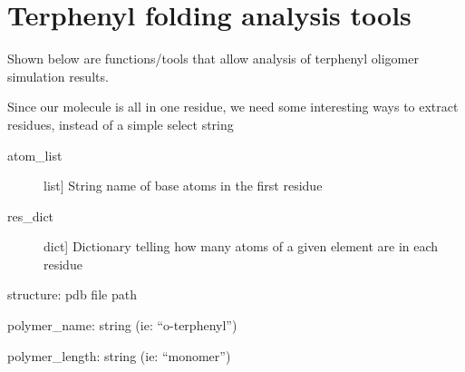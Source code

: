 \documentclass[letterpaper,12pt,english,openany,oneside]{sphinxmanual}
\begin{document}
\chapter{Terphenyl folding analysis tools}
\label{\detokenize{analysis:terphenyl-folding-analysis-tools}}\label{\detokenize{analysis::doc}}
Shown below are functions/tools that allow analysis of terphenyl oligomer simulation results.

\label{\detokenize{analysis:module-analysis}}

\begin{fulllineitems}
\label{\detokenize{analysis:analysis.construct_selector}}
Since our molecule is all in one residue, we need some interesting ways to extract residues, instead of a simple
select string
\begin{description}
\item[{atom\_list}] \leavevmode{[}list{]}
String name of base atoms in the first residue

\item[{res\_dict}] \leavevmode{[}dict{]}
Dictionary telling how many atoms of a given element are in each residue

\end{description}

\end{fulllineitems}


\begin{fulllineitems}
\label{\detokenize{analysis:analysis.get_end_to_end_distance}}
\end{fulllineitems}


\begin{fulllineitems}
\label{\detokenize{analysis:analysis.get_internal_coordinate_definitions}}
structure: pdb file path

polymer\_name: string (ie: “o-terphenyl”)

polymer\_length: string (ie: “monomer”)

\end{fulllineitems}
\end{document}
